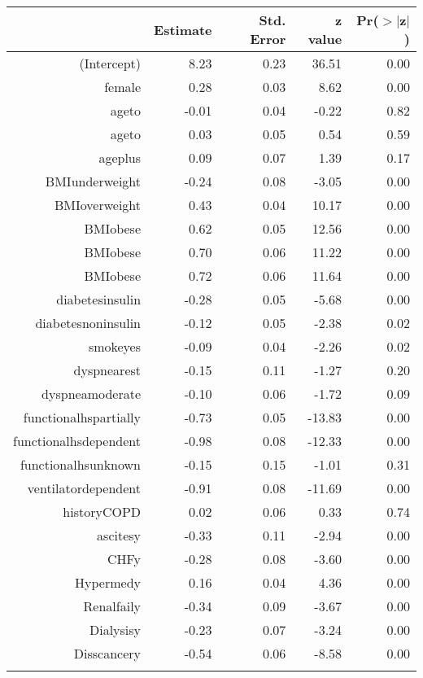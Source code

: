 \bigskip\bigskip
\centering
\begin{tabular}{rrrrr}
  \hline
 & Estimate & Std. Error & z value & Pr($>$$|$z$|$) \\ 
  \hline
(Intercept) & 8.23 & 0.23 & 36.51 & 0.00 \\ 
  female & 0.28 & 0.03 & 8.62 & 0.00 \\ 
  age\-65\-to\-74 & -0.01 & 0.04 & -0.22 & 0.82 \\ 
  age\-75\-to\-84 & 0.03 & 0.05 & 0.54 & 0.59 \\ 
  age\-85\-plus & 0.09 & 0.07 & 1.39 & 0.17 \\ 
  BMI\-underweight & -0.24 & 0.08 & -3.05 & 0.00 \\ 
  BMI\-overweight & 0.43 & 0.04 & 10.17 & 0.00 \\ 
  BMI\-obese\-1 & 0.62 & 0.05 & 12.56 & 0.00 \\ 
  BMI\-obese\-2 & 0.70 & 0.06 & 11.22 & 0.00 \\ 
  BMI\-obese\-3 & 0.72 & 0.06 & 11.64 & 0.00 \\ 
  diabetes\-insulin & -0.28 & 0.05 & -5.68 & 0.00 \\ 
  diabetes\-noninsulin & -0.12 & 0.05 & -2.38 & 0.02 \\ 
  smoke\-yes & -0.09 & 0.04 & -2.26 & 0.02 \\ 
  dyspnea\-rest & -0.15 & 0.11 & -1.27 & 0.20 \\ 
  dyspnea\-moderate & -0.10 & 0.06 & -1.72 & 0.09 \\ 
  functional\-hs\-partially & -0.73 & 0.05 & -13.83 & 0.00 \\ 
  functional\-hs\-dependent & -0.98 & 0.08 & -12.33 & 0.00 \\ 
  functional\-hs\-unknown & -0.15 & 0.15 & -1.01 & 0.31 \\ 
  ventilator\-dependent & -0.91 & 0.08 & -11.69 & 0.00 \\ 
  history\-COPD & 0.02 & 0.06 & 0.33 & 0.74 \\ 
  ascites\-y & -0.33 & 0.11 & -2.94 & 0.00 \\ 
  CHF\-y & -0.28 & 0.08 & -3.60 & 0.00 \\ 
  Hyper\-med\-y & 0.16 & 0.04 & 4.36 & 0.00 \\ 
  Renal\-fail\-y & -0.34 & 0.09 & -3.67 & 0.00 \\ 
  Dialysis\-y & -0.23 & 0.07 & -3.24 & 0.00 \\ 
  Diss\-cancer\-y & -0.54 & 0.06 & -8.58 & 0.00 \\ 
$$
\end{tabular}
